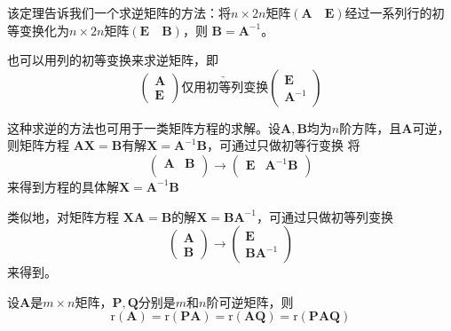 \begin{remark}
    该定理告诉我们一个求逆矩阵的方法：将$n\times 2n$矩阵$(\boldsymbol{A}\quad\boldsymbol{E})$经过一系列行的初等变换化为$n\times 2n$矩阵$(\boldsymbol{E}\quad\boldsymbol{B})$，则
    $\boldsymbol{B}=\boldsymbol{A}^{-1}$。

    也可以用列的初等变换来求逆矩阵，即
    $$\left(\begin{array}{c}
        \boldsymbol{A}\\
        \boldsymbol{E}        
    \end{array}\right) \underrightarrow {\text{仅用初等列变换}}\left(\begin{array}{c}
        \boldsymbol{E}\\
        \boldsymbol{A}^{-1}        
    \end{array}\right)$$

    这种求逆的方法也可用于一类矩阵方程的求解。设$\boldsymbol{A},\boldsymbol{B}$均为$n$阶方阵，且$\boldsymbol{A}$可逆，则矩阵方程
    $\boldsymbol{A}\boldsymbol{X}=\boldsymbol{B}$有解$\boldsymbol{X}=\boldsymbol{A}^{-1}\boldsymbol{B}$，可通过只做初等行变换
    将$$\left(\begin{array}{cc}
        \boldsymbol{A} & \boldsymbol{B}\\
    \end{array}\right) \longrightarrow  \left(\begin{array}{cc}
        \boldsymbol{E} & \boldsymbol{A}^{-1}\boldsymbol{B}\\
    \end{array}\right)$$来得到方程的具体解$\boldsymbol{X}=\boldsymbol{A}^{-1}\boldsymbol{B}$

    类似地，对矩阵方程 $\boldsymbol{X}\boldsymbol{A}=\boldsymbol{B}$的解$\boldsymbol{X}=\boldsymbol{B}\boldsymbol{A}^{-1}$，可通过只做初等列变换
    $$\left(\begin{array}{c}
        \boldsymbol{A} \\
        \boldsymbol{B}
    \end{array}\right) \longrightarrow  \left(\begin{array}{c}
        \boldsymbol{E} \\
        \boldsymbol{B}\boldsymbol{A}^{-1}
    \end{array}\right)$$来得到。
\end{remark}

\begin{theorem}
    设$\boldsymbol{A}$是$m\times n$矩阵，$\boldsymbol{P},\boldsymbol{Q}$分别是$m$和$n$阶可逆矩阵，则
    $$\mathrm{r}(\boldsymbol{A})=\mathrm{r}(\boldsymbol{P}\boldsymbol{A})=\mathrm{r}(\boldsymbol{A}\boldsymbol{Q})=\mathrm{r}(\boldsymbol{P}\boldsymbol{A}\boldsymbol{Q})$$
\end{theorem}

